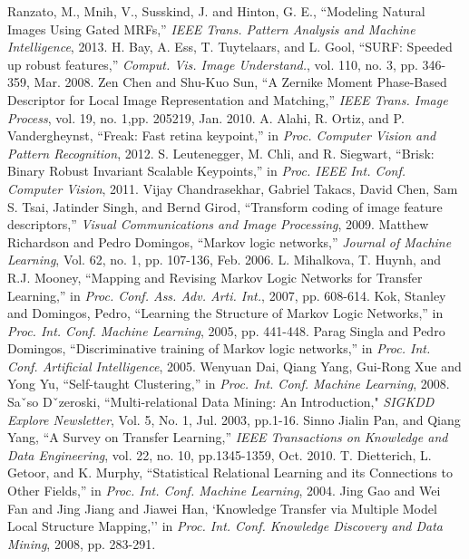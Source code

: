 \documentclass[journal]{IEEEtran}
\begin{document}
\begin{thebibliography}{1}
 Ranzato, M., Mnih, V., Susskind, J. and Hinton, G. E., ``Modeling Natural Images Using Gated MRFs,'' \textit{IEEE Trans. Pattern Analysis
and Machine Intelligence}, 2013.
 H. Bay, A. Ess, T. Tuytelaars, and L. Gool, ``SURF: Speeded up robust features,'' \textit{Comput. Vis. Image Understand.},  vol. 110, no. 3, pp. 346-359, Mar. 2008.
 Zen Chen and Shu-Kuo Sun, ``A Zernike Moment Phase-Based Descriptor for Local Image Representation and Matching,'' \textit{IEEE Trans. Image Process}, vol. 19, no. 1,pp. 205219, Jan. 2010.
 A. Alahi, R. Ortiz, and P. Vandergheynst, ``Freak: Fast retina keypoint,'' in \textit{Proc. Computer Vision and Pattern Recognition}, 2012.
 S. Leutenegger, M. Chli, and R. Siegwart, ``Brisk: Binary Robust Invariant Scalable Keypoints,'' in \textit{Proc. IEEE Int. Conf. Computer Vision}, 2011.
 Vijay Chandrasekhar, Gabriel Takacs, David Chen, Sam S. Tsai, Jatinder Singh, and Bernd Girod, ``Transform coding of image feature descriptors,'' \textit{Visual Communications and Image Processing}, 2009.
 Matthew Richardson and Pedro Domingos, ``Markov logic networks,'' \textit{Journal of Machine Learning}, Vol. 62, no. 1, pp. 107-136, Feb. 2006.
 L. Mihalkova, T. Huynh, and R.J. Mooney, ``Mapping and Revising Markov Logic Networks for Transfer Learning,'' in \textit{Proc. Conf. Ass. Adv. Arti. Int.}, 2007, pp. 608-614.
 Kok, Stanley and Domingos, Pedro, ``Learning the Structure of Markov Logic Networks,'' in \textit{Proc. Int. Conf. Machine Learning}, 2005, pp. 441-448.
 Parag Singla and Pedro Domingos, ``Discriminative training of Markov logic networks,'' in \textit{Proc. Int. Conf. Artiﬁcial Intelligence}, 2005.
 Wenyuan Dai, Qiang Yang, Gui-Rong Xue and Yong Yu, ``Self-taught Clustering,''  in \textit{Proc. Int. Conf. Machine Learning}, 2008.
 Saˇso Dˇzeroski, ``Multi-relational Data Mining: An Introduction," \textit{SIGKDD Explore Newsletter}, Vol. 5, No. 1, Jul. 2003, pp.1-16.
 Sinno Jialin Pan, and Qiang Yang, ``A Survey on Transfer Learning,'' \textit{IEEE Transactions on Knowledge and Data Engineering}, vol. 22, no. 10, pp.1345-1359, Oct. 2010.
 T. Dietterich, L. Getoor, and K. Murphy, ``Statistical Relational Learning and its Connections to Other Fields,'' in \textit{Proc. Int. Conf. Machine Learning}, 2004.
 Jing Gao and Wei Fan and Jing Jiang and Jiawei Han, `Knowledge Transfer via Multiple Model Local Structure Mapping,'' in \textit{Proc. Int. Conf. Knowledge Discovery and Data Mining}, 2008, pp. 283-291.

\end{thebibliography}
\end{document}
